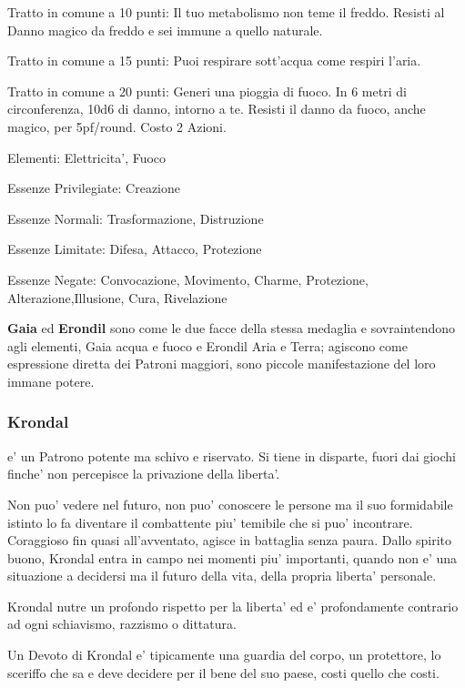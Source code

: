 \documentclass[a4paper,11pt,twoside,openany]{book}
\begin{document}
{		Tratto in comune a 10 punti: Il tuo metabolismo non teme il freddo. Resisti al Danno magico da freddo e sei immune a quello naturale.
		
		Tratto in comune a 15 punti: Puoi respirare sott'acqua come respiri l'aria.
		
		Tratto in comune a 20 punti: Generi una pioggia di fuoco. In 6 metri di circonferenza, 10d6 di danno, intorno a te. Resisti il danno da fuoco, anche magico, per 5pf/round. Costo 2 Azioni.
		
		\bigskip
		
		Elementi: Elettricita', Fuoco
		
		\bigskip
		
		Essenze Privilegiate: Creazione
		
		Essenze Normali: Trasformazione, Distruzione
		
		Essenze Limitate: Difesa, Attacco, Protezione
		
		Essenze Negate: Convocazione, Movimento, Charme, Protezione, Alterazione,Illusione, Cura, Rivelazione
		
		\bigskip
		
		\textbf{Gaia} ed \textbf{Erondil} sono come le due facce della stessa medaglia e sovraintendono agli elementi, Gaia acqua e fuoco e Erondil Aria e Terra; agiscono come espressione diretta dei Patroni maggiori, sono piccole manifestazione del loro immane potere.
		
		\subsubsection{Krondal}
		
		\label{krondal}
		
		e' un Patrono potente ma schivo e riservato. Si tiene in disparte, fuori dai giochi finche' non percepisce la privazione della liberta'.
		
		Non puo' vedere nel futuro, non puo' conoscere le persone ma il suo formidabile istinto lo fa diventare il combattente piu' temibile che si puo' incontrare. Coraggioso fin quasi all'avventato, agisce in battaglia senza paura. Dallo spirito buono, Krondal entra in campo nei momenti piu' importanti, quando non e' una situazione a decidersi ma il futuro della vita, della propria liberta' personale.
		
		Krondal nutre un profondo rispetto per la liberta' ed e' profondamente contrario ad ogni schiavismo, razzismo o dittatura.
		
		Un Devoto di Krondal e' tipicamente una guardia del corpo, un protettore, lo sceriffo che sa e deve decidere per il bene del suo paese, costi quello che costi. 
		
}
\end{document}
